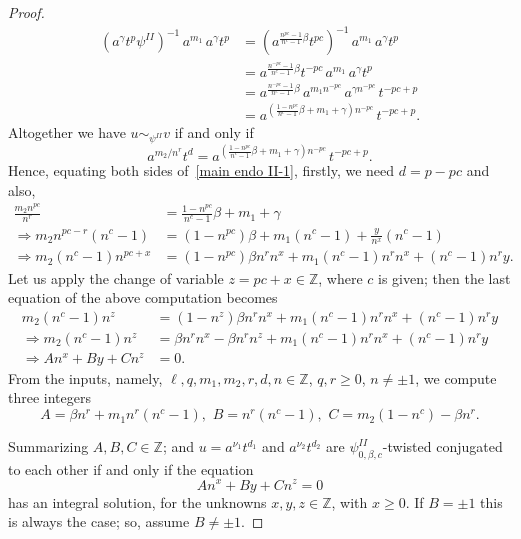 \documentclass[10pt,a4paper]{amsart}
\newcommand\ZZ{\mathbb{Z}}
\begin{document}
\begin{proof}
%
\begin{align*}
    (a^{\gamma}t^p \psi^{II})^{-1} \, a^{m_1} \, a^{\gamma}t^p 
    &= (a^{\frac{n^{pc} -1}{n^c -1}\beta}t^{pc})^{-1} \, a^{m_1} \, a^{\gamma}t^p \\
    &= a^{\frac{n^{-pc} -1}{n^c -1}\beta}t^{-pc} \, a^{m_1} \, a^{\gamma}t^p \\
    &= a^{\frac{n^{-pc} -1}{n^c -1}\beta} \, a^{m_1n^{-pc}} \, a^{\gamma n^{-pc}} \, t^{-pc+p}\\
    &= a^{(\frac{1 - n^{pc}}{n^c -1}\beta + m_1 + \gamma)n^{-pc}} \, t^{-pc+p}.
\end{align*}
%
Altogether we have $u \sim_{\psi^{II}} v$ if and only if 
%
\begin{equation}\label{main endo II-1}
  a^{m_2/n^r} t^d = a^{(\frac{1 - n^{pc}}{n^c -1}\beta + m_1 + \gamma)n^{-pc}} \, t^{-pc+p}.  
\end{equation}
%
Hence, equating both sides of~\eqref{main endo II-1}, firstly, we need $d = p-pc$ and also,
%
\begin{align*}
    \frac{m_2n^{pc}}{n^r} & = \frac{1 - n^{pc}}{n^c -1}\beta + m_1 + \gamma\\
    \Rightarrow m_2n^{pc-r}(n^c - 1) & = (1 - n^{pc})\beta + m_1(n^c - 1) + \frac{y}{n^x}(n^c - 1)\\
    \Rightarrow m_2(n^c - 1)n^{pc+x} & = (1 - n^{pc})\beta n^r n^x + m_1(n^c - 1) n^r n^x + (n^c - 1) n^r y.
\end{align*}
%
Let us apply the change of variable $z = pc + x\in \ZZ$, where $c$ is given; then the last equation of the above computation becomes
%
\begin{align*}
m_2(n^c - 1)n^{ z} & = (1 - n^{z})\beta n^r n^x + m_1(n^c - 1) n^r n^x + (n^c - 1) n^r y \\
\Rightarrow m_2(n^c - 1)n^{ z} & = \beta n^r n^x - \beta n^r n^{ z} + m_1(n^c - 1) n^r n^x + (n^c - 1) n^r y\\
\Rightarrow An^x + By + Cn^{ z} & =0.
\end{align*}
%
From the inputs, namely, $\ell, q, m_1, m_2, r, d, n \in \ZZ$, $q, r \geq 0$, $n \neq \pm 1$, we compute three integers
\[
A = \beta n^r + m_1n^r(n^c-1), \, \, B= n^r(n^c -1), \, \, C = m_2(1-n^c) - \beta n^r.
\]

Summarizing $A,B,C\in \ZZ$; and $u = a^{\nu_1} t^{d_1}$ and $a^{\nu_2} t^{d_2}$ are $\psi^{II}_{0, \beta, c}$-twisted conjugated to each other if and only if the equation 
 \begin{equation}\label{equ: main endo II-2}
An^x +By + Cn^z = 0
 \end{equation}
has an integral solution, for the unknowns $x,y,z\in \ZZ$, with $x\geq 0$. If $B=\pm 1$ this is always the case; so, assume $B\neq \pm 1$.


\end{proof}
\end{document}
